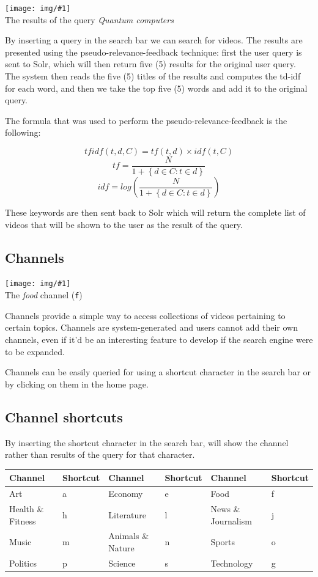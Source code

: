\documentclass[12pt]{exam}
\newcommand{\lp}{\left(}
\newcommand{\rp}{\right)}
\newcommand{\pic}[2]{{
\begin{center}
\texttt{[image: img/\#1]} \\
{#2}
\end{center}
}}
\begin{document}
\pic{se_query}{The results of the query \textit{Quantum computers}}

By inserting a query in the search bar we can search for videos.
The results are presented using the pseudo-relevance-feedback technique:
first the user query is sent to Solr, which will then return five (5) 
results for the original user query. The system then reads the five (5)
titles of the results and computes the td-idf for each word, and then we take
the top five (5) words and add it to the original query.

The formula that was used to perform the pseudo-relevance-feedback is the
following:

$$
tfidf \lp t, d, C \rp = tf \lp t, d \rp \times idf \lp t, C \rp
$$
$$
tf = \dfrac{N}{1 + \left\{ d \in C : t \in d \right\}}
$$
$$
idf = log \lp \dfrac{N}{1 + \left\{ d \in C : t \in d \right\}} \rp
$$

These keywords are then sent back to Solr which will return the complete list
of videos that will be shown to the user as the result of the query.

\subsection{Channels}

\pic{se_channel}{The \textit{food} channel (\texttt{f})}

Channels provide a simple way to access collections of videos pertaining
to certain topics. Channels are system-generated and users cannot add
their own channels, even if it'd be an interesting feature to develop if
the search engine were to be expanded.

Channels can be easily queried for using a shortcut character in the search
bar or by clicking on them in the home page.

\subsection*{Channel shortcuts}

By inserting the shortcut character in the search bar, will show the channel
rather than results of the query for that character.

\begin{center}
\begin{tabular}{ll|ll|ll}
Channel & Shortcut & Channel & Shortcut & Channel & Shortcut \\\hline
Art               & a & Economy           & e & Food               & f \\
Health \& Fitness & h & Literature        & l & News \& Journalism & j \\
Music             & m & Animals \& Nature & n & Sports             & o \\
Politics          & p & Science           & s & Technology         & g \\
\end{tabular}
\end{center}
\end{document}
